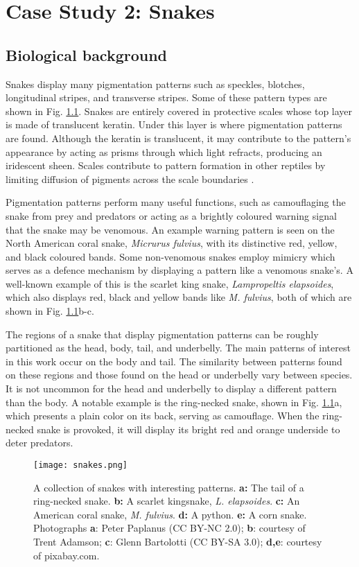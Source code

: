 \chapter{Case Study 2: Snakes}

\section{Biological background}
Snakes display many pigmentation patterns such as speckles, blotches, longitudinal stripes, and transverse stripes. Some of these pattern types are shown in Fig. \ref{fig:realSnakePatterns}. Snakes are entirely covered in protective scales whose top layer is made of translucent keratin. Under this layer is where pigmentation patterns are found. Although the keratin is translucent, it may contribute to the pattern's appearance by acting as prisms through which light refracts, producing an iridescent sheen. Scales contribute to pattern formation in other reptiles by limiting diffusion of pigments across the scale boundaries \citep{manukyan2017}.

Pigmentation patterns perform many useful functions, such as camouflaging the snake from prey and predators or acting as a brightly coloured warning signal that the snake may be venomous. An example warning pattern is seen on the North American coral snake, \textit{Micrurus fulvius}, with its distinctive red, yellow, and black coloured bands. Some non-venomous snakes employ mimicry which serves as a defence mechanism by displaying a pattern like a venomous snake's. A well-known example of this is the scarlet king snake, \textit{Lampropeltis elapsoides}, which also displays red, black and yellow bands like \textit{M. fulvius}, both of which are shown in Fig. \ref{fig:realSnakePatterns}b-c.

The regions of a snake that display pigmentation patterns can be roughly partitioned as the head, body, tail, and underbelly. The main patterns of interest in this work occur on the body and tail. The similarity between patterns found on these regions and those found on the head or underbelly vary between species. It is not uncommon for the head and underbelly to display a different pattern than the body. A notable example is the ring-necked snake, shown in Fig. \ref{fig:realSnakePatterns}a, which presents a plain color on its back, serving as camouflage. When the ring-necked snake is provoked, it will display its bright red and orange underside to deter predators.

\begin{figure}[hb]
	\centering
	\texttt{[image: snakes.png]}
	\caption{A collection of snakes with interesting patterns. \textbf{a:} The tail of a ring-necked snake. \textbf{b:} A scarlet kingsnake, \textit{L. elapsoides}. \textbf{c:} An American coral snake, \textit{M. fulvius}. \textbf{d:} A python. \textbf{e:} A corn snake. \textcolor{citation-gray}{Photographs \textbf{a}: Peter Paplanus (CC BY-NC 2.0); \textbf{b}: courtesy of Trent Adamson; \textbf{c}: Glenn Bartolotti (CC BY-SA 3.0); \textbf{d,e}: courtesy of pixabay.com.}}
	\label{fig:realSnakePatterns}
\end{figure}

